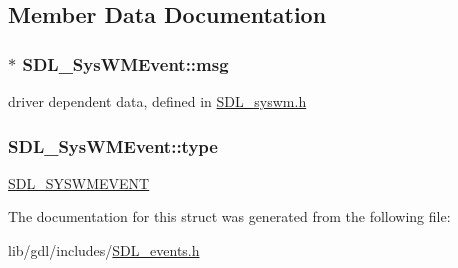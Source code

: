 \subsection{Member Data Documentation}
\hypertarget{struct_s_d_l___sys_w_m_event_ad5e3dc68aa15582cd0641847d41c74e8}{}
\subsubsection[{msg}]{$\ast$ S\+D\+L\+\_\+\+Sys\+W\+M\+Event\+::msg}\label{struct_s_d_l___sys_w_m_event_ad5e3dc68aa15582cd0641847d41c74e8}
driver dependent data, defined in \hyperlink{_s_d_l__syswm_8h}{S\+D\+L\+\_\+syswm.\+h} \hypertarget{struct_s_d_l___sys_w_m_event_a84697e96cb16bf6a570e10b5bfdcd392}{}
\subsubsection[{type}]{ S\+D\+L\+\_\+\+Sys\+W\+M\+Event\+::type}\label{struct_s_d_l___sys_w_m_event_a84697e96cb16bf6a570e10b5bfdcd392}
\hyperlink{_s_d_l__events_8h_a3b589e89be6b35c02e0dd34a55f3fccaa73749d735a18ce6ef17a09ee70d5dbe7}{S\+D\+L\+\_\+\+S\+Y\+S\+W\+M\+E\+V\+E\+N\+T} 

The documentation for this struct was generated from the following file\+:\begin{DoxyCompactItemize}
\item 
lib/gdl/includes/\hyperlink{_s_d_l__events_8h}{S\+D\+L\+\_\+events.\+h}\end{DoxyCompactItemize}

